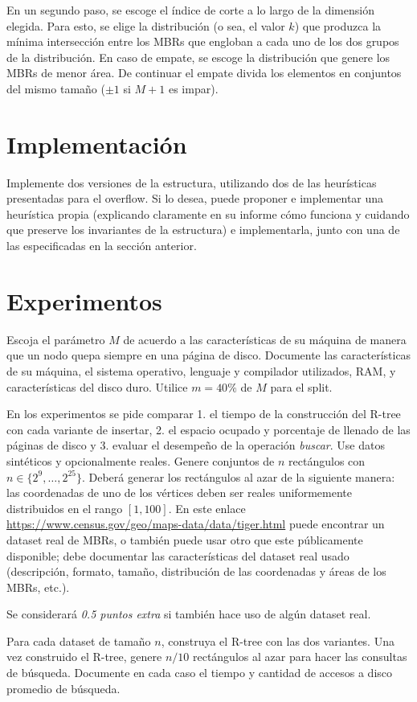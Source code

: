 \documentclass[dcc,uchile]{fcfmcourse}
\begin{document}
En un segundo paso, se escoge el índice de corte a lo largo de la dimensión elegida. Para esto, se elige la distribución (o sea, el valor $k$) que produzca la mínima intersección entre los MBRs que engloban a cada uno de los dos grupos de la distribución. En caso de empate, se escoge la distribución que genere los MBRs de menor área. De continuar el empate divida los elementos en conjuntos del mismo tamaño ($\pm1$ si $M+1$ es impar).
\section{Implementación}
Implemente dos versiones de la estructura, utilizando dos de las heurísticas presentadas para el overflow. Si lo desea, puede proponer e implementar una heurística propia (explicando claramente en su informe cómo funciona y cuidando que preserve los invariantes de la estructura) e implementarla, junto con una de las especificadas en la sección anterior.
\section{Experimentos}
Escoja el parámetro $M$ de acuerdo a las características de su máquina de manera que un nodo quepa siempre en una página de disco. Documente las características de su máquina, el sistema operativo, lenguaje y compilador utilizados, RAM, y características del disco duro. Utilice $m=40\%$ de $M$ para el split.

En los experimentos se pide comparar 1. el tiempo de la construcción del R-tree con cada variante de insertar, 2. el espacio ocupado y porcentaje de llenado de las páginas de disco y 3. evaluar el desempeño de la operación \textit{buscar}.
Use datos sintéticos y opcionalmente reales. Genere conjuntos de $n$ rectángulos con $n\in \{2^9,\ldots,2^25\}$. Deberá generar los rectángulos al azar de la siguiente manera: las coordenadas de uno de los vértices deben ser reales uniformemente distribuidos en el rango $[1,100]$. En este enlace \href{https://www.census.gov/geo/maps-data/data/tiger.html}{https://www.census.gov/geo/maps-data/data/tiger.html} puede encontrar un dataset real de MBRs, o también puede usar otro que este públicamente disponible; debe documentar las características del dataset real usado (descripción, formato, tamaño, distribución de las coordenadas y áreas de los MBRs, etc.).

Se considerará \textit{0.5 puntos extra} si también hace uso de algún dataset real.

Para cada dataset de tamaño $n$, construya el R-tree con las dos variantes. Una vez construido el R-tree, genere $n/10$ rectángulos al azar para hacer las consultas de búsqueda. Documente en cada caso el tiempo y cantidad de accesos a disco promedio de búsqueda.
\end{document}
